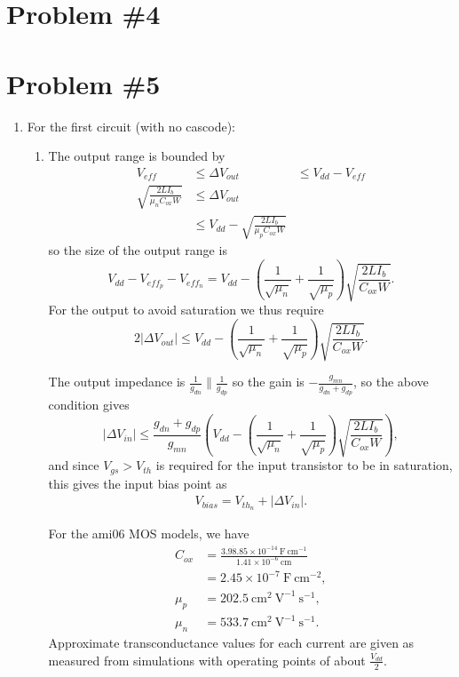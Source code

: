\documentclass{article}
\begin{document}
\section*{Problem \#4}


\section*{Problem \#5}
\begin{enumerate}
  \item{
    For the first circuit (with no cascode):
    \begin{enumerate}
      \item{
        The output range is bounded by
        \begin{align*}
        V_{eff} &\leq \Delta V_{out} 
                &\leq V_{dd} - V_{eff} \\
        \sqrt{\frac{2 L I_b}{\mu_n C_{ox} W}} 
                &\leq \Delta V_{out} \\
                &\leq V_{dd} - \sqrt{\frac{2 L I_b}{\mu_p C_{ox} W}} 
        \end{align*}
        so the size of the output range is
        $$
        V_{dd} - V_{eff_{p}} - V_{eff_{n}} = 
        V_{dd} 
      - \left(\frac{1}{\sqrt{\mu_n}}
            + \frac{1}{\sqrt{\mu_p}}\right)
        \sqrt{\frac{2 L I_b}{C_{ox} W}}.
        $$
        For the output to avoid saturation we thus require
        $$
        2|\Delta V_{out}| \leq 
        V_{dd} 
      - \left(\frac{1}{\sqrt{\mu_n}}
            + \frac{1}{\sqrt{\mu_p}}\right)
        \sqrt{\frac{2 L I_b}{C_{ox} W}}.
        $$

        The output impedance is $\frac{1}{g_{dn}} \| \frac{1}{g_{dp}}$ so the gain is 
        $-\frac{g_{mn}}{g_{dn} + g_{dp}}$, so the above condition gives
        $$
        |\Delta V_{in}| \leq \frac{g_{dn} + g_{dp}}{g_{mn}} \left(
        V_{dd} 
      - \left(\frac{1}{\sqrt{\mu_n}}
            + \frac{1}{\sqrt{\mu_p}}\right)
        \sqrt{\frac{2 L I_b}{C_{ox} W}}\right),
        $$
        and since $V_{gs} > V_{th}$ is required for the input transistor
        to be in saturation, this gives the input bias point as
        \begin{align*}
        V_{bias} = V_{th_{n}} + |\Delta V_{in}|.
        \end{align*}

        For the ami06 MOS models, we have 
        \begin{align*}
        C_{ox} &= \frac{3.9 \dot 8.85 \times 10^{-14} ~\mathrm{F}~\mathrm{cm}^{-1}}
                      {1.41 \times 10^{-6} ~\mathrm{cm}} \\
               &= 2.45 \times 10^{-7} ~\mathrm{F}~\mathrm{cm}^{-2}, \\
        \mu_p  &= 202.5 ~\mathrm{cm}^2~\mathrm{V}^{-1}~\mathrm{s}^{-1}, \\
        \mu_n  &= 533.7 ~\mathrm{cm}^2~\mathrm{V}^{-1}~\mathrm{s}^{-1}.
        \end{align*}
        Approximate transconductance values for each current are given as measured 
        from simulations with operating points of about $\frac{V_{dd}}{2}$.

}
\end{enumerate}}
\end{enumerate}
\end{document}
